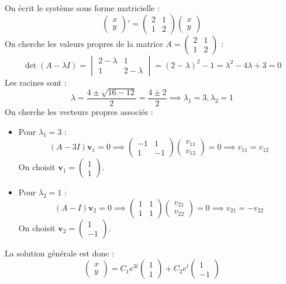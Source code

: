 \documentclass[12pt]{article}
\begin{document}
\begin{mybox}[Solution]
On écrit le système sous forme matricielle :
\[
\begin{pmatrix} x \\ y \end{pmatrix}' = \begin{pmatrix} 2 & 1 \\ 1 & 2 \end{pmatrix} \begin{pmatrix} x \\ y \end{pmatrix}
\]
On cherche les valeurs propres de la matrice $A = \begin{pmatrix} 2 & 1 \\ 1 & 2 \end{pmatrix}$ :
\[
\det(A - \lambda I) = \begin{vmatrix} 2 - \lambda & 1 \\ 1 & 2 - \lambda \end{vmatrix} = (2 - \lambda)^2 - 1 = \lambda^2 - 4\lambda + 3 = 0
\]
Les racines sont :
\[
\lambda = \frac{4 \pm \sqrt{16 - 12}}{2} = \frac{4 \pm 2}{2} \implies \lambda_1 = 3, \lambda_2 = 1
\]
On cherche les vecteurs propres associés :
\begin{itemize}
    \item Pour $\lambda_1 = 3$ :
    \[
    (A - 3I) \mathbf{v}_1 = 0 \implies \begin{pmatrix} -1 & 1 \\ 1 & -1 \end{pmatrix} \begin{pmatrix} v_{11} \\ v_{12} \end{pmatrix} = 0 \implies v_{11} = v_{12}
    \]
    On choisit $\mathbf{v}_1 = \begin{pmatrix} 1 \\ 1 \end{pmatrix}$.
    \item Pour $\lambda_2 = 1$ :
    \[
    (A - I) \mathbf{v}_2 = 0 \implies \begin{pmatrix} 1 & 1 \\ 1 & 1 \end{pmatrix} \begin{pmatrix} v_{21} \\ v_{22} \end{pmatrix} = 0 \implies v_{21} = -v_{22}
    \]
    On choisit $\mathbf{v}_2 = \begin{pmatrix} 1 \\ -1 \end{pmatrix}$.
\end{itemize}
La solution générale est donc :
\[
\boxed{\begin{pmatrix} x \\ y \end{pmatrix} = C_1 e^{3t} \begin{pmatrix} 1 \\ 1 \end{pmatrix} + C_2 e^{t} \begin{pmatrix} 1 \\ -1 \end{pmatrix}}
\]
\end{mybox}
\end{document}
